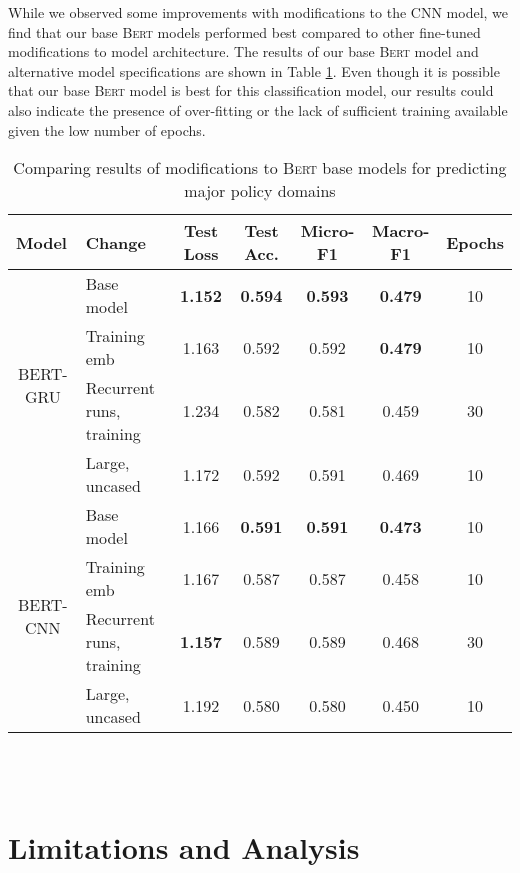 \documentclass[11pt]{article}
\begin{document}
While we observed some improvements with modifications to the CNN model, we find that our base \textsc{Bert} models performed best compared to other fine-tuned modifications to model architecture. The results of our base \textsc{Bert} model and alternative model specifications are shown in Table \ref{tab:BERTchange}. Even though it is possible that our base \textsc{Bert} model is best for this classification model, our results could also indicate the presence of over-fitting or the lack of sufficient training available given the low number of epochs.

\begin{table}[htbp]
  \centering
    \begin{tabular}{clccccc}
    \toprule
    \multicolumn{1}{l}{Model} & Change & Test Loss & Test Acc. & Micro-F1 & Macro-F1 & Epochs \\
    \midrule
    \multirow{4}[2]{*}{BERT-GRU} & Base model & \textbf{1.152} & \textbf{0.594} & \textbf{0.593} & \textbf{0.479} & 10 \\
          & Training emb & 1.163 & 0.592 & 0.592 & \textbf{0.479} & 10 \\
          & Recurrent runs, training  & 1.234 & 0.582 & 0.581 & 0.459 & 30 \\
          & Large, uncased & 1.172 & 0.592 & 0.591 & 0.469 & 10 \\
    \midrule
    \multirow{4}[1]{*}{BERT-CNN} & Base model & 1.166 & \textbf{0.591} & \textbf{0.591} & \textbf{0.473} & 10 \\
          & Training emb & 1.167 & 0.587 & 0.587 & 0.458 & 10 \\
          & Recurrent runs, training  & \textbf{1.157} & 0.589 & 0.589 & 0.468 & 30 \\
          & Large, uncased & 1.192 & 0.580 & 0.580 & 0.450 & 10 \\
    \bottomrule
    \end{tabular} \\~\\%
    \caption{Comparing results of modifications to \textsc{Bert} base models for predicting major policy domains}
  \label{tab:BERTchange}%
\end{table}%


\section{Limitations and Analysis}
\label{discussion}
\end{document}
